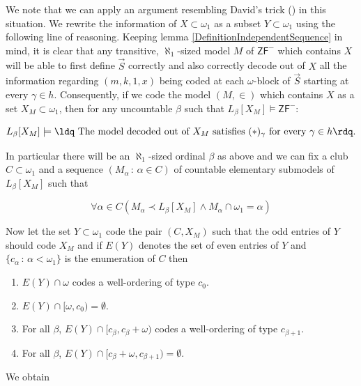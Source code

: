 \documentclass[a4paper,11pt]{article}
\newcommand{\ZFP}{\mathsf{ZF}^-}
\begin{document}
    We note that we can apply an argument resembling David's trick (\cite{David}) in this situation. We rewrite the information of $X \subset \omega_1$ as a subset $Y \subset \omega_1$ using the following line of reasoning. Keeping lemma \ref{DefinitionIndependentSequence} in mind, it is clear that any transitive, $\aleph_1$-sized model $M$ of $\ZFP$ which contains $X$ will be able to first define $\vec{S}$ correctly  and also correctly decode out of $X$ all the information regarding $(m,k,1,x)$ being coded at each $\omega$-block of $\vec{S}$ starting at every $\gamma \in h$. Consequently, if we code the model $(M,\in)$ which contains $X$ as a set $X_M \subset \omega_1$, then for any uncountable $\beta$ such that $L_{\beta}[X_M] \models \ZFP$:
    
    \[L_{\beta}[X_M] \models \text{\ldq The model decoded out of }X_M \text{ satisfies $(\ast)_{\gamma}$ for every $\gamma \in h$\rdq.} \]
    
    In particular there will be an $\aleph_1$-sized ordinal $\beta$ as above and we can fix a club $C \subset \omega_1$ and a sequence $(M_{\alpha} \, : \, \alpha \in C)$ of countable elementary submodels  of $L_{\beta} [X_M]$ such that
    
    \[\forall \alpha \in C (M_{\alpha} \prec L_{\beta}[X_M] \land M_{\alpha} \cap \omega_1 = \alpha)\]
    
    Now let the set $Y\subset \omega_1$ code the pair $(C, X_M)$ such that the odd entries of $Y$ should code $X_M$ and if $E(Y)$ denotes  the set of even entries of $Y$ and $\{c_{\alpha} \, : \, \alpha < \omega_1\}$ is the enumeration of $C$ then
    
    \begin{enumerate}
    
    \item $E(Y) \cap \omega$ codes a well-ordering of type $c_0$.
    
    \item $E(Y) \cap [\omega, c_0) = \emptyset$.
    
    \item For all $\beta$, $E(Y) \cap [c_{\beta}, c_{\beta} + \omega)$ codes a well-ordering of type $c_{\beta+1}$.
    
    \item For all $\beta$, $E(Y) \cap [c_{\beta}+\omega, c_{\beta+1})= \emptyset$.
    
    \end{enumerate}
    
    We obtain
    
\end{document}
